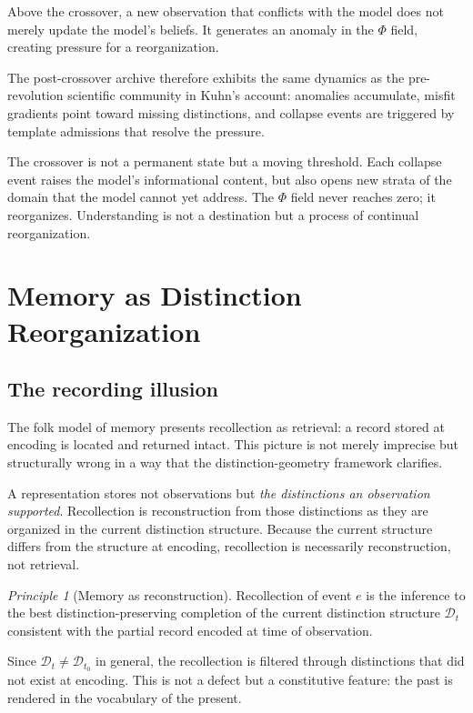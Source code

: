 \documentclass[11pt, a4paper]{article}
\theoremstyle{plain}
\theoremstyle{definition}
\theoremstyle{remark}
\newtheorem{principle}[theorem]{Principle}
\newcommand{\Dist}{\mathcal{D}}
\newcommand{\PhiF}{\varPhi}
\begin{document}
Above the crossover, a new observation that conflicts with the
model does not merely update the model's beliefs. It generates
an anomaly in the $\PhiF$ field, creating pressure for a
reorganization.

The post-crossover archive therefore exhibits the same dynamics
as the pre-revolution scientific community in Kuhn's account:
anomalies accumulate, misfit gradients point toward missing
distinctions, and collapse events are triggered by template
admissions that resolve the pressure.

The crossover is not a permanent state but a moving threshold.
Each collapse event raises the model's informational content,
but also opens new strata of the domain that the model cannot
yet address. The $\PhiF$ field never reaches zero; it reorganizes.
Understanding is not a destination but a process of continual
reorganization.

\section{Memory as Distinction Reorganization}
\label{sec:memory}

\subsection{The recording illusion}

The folk model of memory presents recollection as retrieval: a
record stored at encoding is located and returned intact.
This picture is not merely imprecise but structurally wrong in
a way that the distinction-geometry framework clarifies.

A representation stores not observations but \emph{the distinctions
an observation supported}. Recollection is reconstruction from
those distinctions as they are organized in the current
distinction structure. Because the current structure differs from
the structure at encoding, recollection is necessarily reconstruction,
not retrieval.

\begin{principle}[Memory as reconstruction]
\label{prin:memory}
Recollection of event $e$ is the inference to the best
distinction-preserving completion of the current distinction
structure $\Dist_t$ consistent with the partial record
encoded at time of observation.

Since $\Dist_t \neq \Dist_{t_0}$ in general, the recollection
is filtered through distinctions that did not exist at encoding.
This is not a defect but a constitutive feature: the past is
rendered in the vocabulary of the present.
\end{principle}
\end{document}
